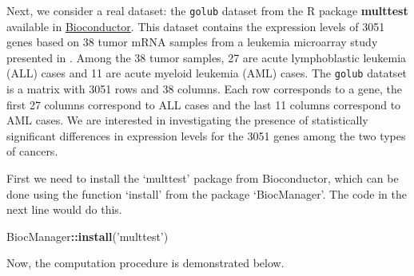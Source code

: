 \documentclass[
]{book}
\newenvironment{Shaded}{\begin{snugshade}}{\end{snugshade}}
\newcommand{\KeywordTok}[1]{\textcolor[rgb]{0.13,0.29,0.53}{\textbf{#1}}}
\newcommand{\NormalTok}[1]{#1}
\newcommand{\OperatorTok}[1]{\textcolor[rgb]{0.81,0.36,0.00}{\textbf{#1}}}
\newcommand{\StringTok}[1]{\textcolor[rgb]{0.31,0.60,0.02}{#1}}
\begin{document}
Next, we consider a real dataset: the \texttt{golub} dataset from the R package \textbf{multtest} available in \href{https://www.bioconductor.org/packages/release/bioc/html/multtest.html}{Bioconductor}. This dataset contains the expression levels of 3051 genes based on 38 tumor mRNA samples from a leukemia microarray study presented in \citet{golub1999molecular}. Among the 38 tumor samples, 27 are acute lymphoblastic leukemia (ALL) cases and 11 are acute myeloid leukemia (AML) cases. The \texttt{golub} datatset is a matrix with 3051 rows and 38 columns. Each row corresponds to a gene, the first 27 columns correspond to ALL cases and the last 11 columns correspond to AML cases. We are interested in investigating the presence of statistically significant differences in expression levels for the 3051 genes among the two types of cancers.

First we need to install the `multtest' package from Bioconductor, which can be done using the function `install' from the package `BiocManager'. The code in the next line would do this.

\begin{Shaded}
\begin{Highlighting}[]
\NormalTok{BiocManager}\OperatorTok{::}\KeywordTok{install}\NormalTok{(}\StringTok{'multtest'}\NormalTok{)}
\end{Highlighting}
\end{Shaded}

Now, the computation procedure is demonstrated below.
\end{document}
